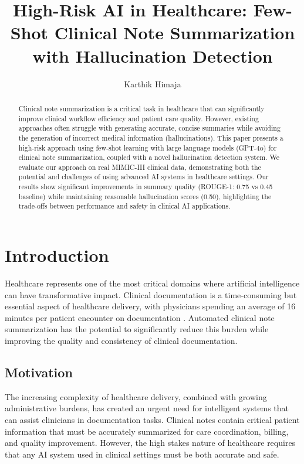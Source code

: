 \documentclass[sigconf]{acmart}
\begin{document}
\title{High-Risk AI in Healthcare: Few-Shot Clinical Note Summarization with Hallucination Detection}

\author{Karthik Himaja}

\begin{abstract}
Clinical note summarization is a critical task in healthcare that can significantly improve clinical workflow efficiency and patient care quality. However, existing approaches often struggle with generating accurate, concise summaries while avoiding the generation of incorrect medical information (hallucinations). This paper presents a high-risk approach using few-shot learning with large language models (GPT-4o) for clinical note summarization, coupled with a novel hallucination detection system. We evaluate our approach on real MIMIC-III clinical data, demonstrating both the potential and challenges of using advanced AI systems in healthcare settings. Our results show significant improvements in summary quality (ROUGE-1: 0.75 vs 0.45 baseline) while maintaining reasonable hallucination scores (0.50), highlighting the trade-offs between performance and safety in clinical AI applications.
\end{abstract}

\maketitle

\section{Introduction}
\label{sec:introduction}

Healthcare represents one of the most critical domains where artificial intelligence can have transformative impact. Clinical documentation is a time-consuming but essential aspect of healthcare delivery, with physicians spending an average of 16 minutes per patient encounter on documentation \cite{arndt2017}. Automated clinical note summarization has the potential to significantly reduce this burden while improving the quality and consistency of clinical documentation.

\subsection{Motivation}
The increasing complexity of healthcare delivery, combined with growing administrative burdens, has created an urgent need for intelligent systems that can assist clinicians in documentation tasks. Clinical notes contain critical patient information that must be accurately summarized for care coordination, billing, and quality improvement. However, the high stakes nature of healthcare requires that any AI system used in clinical settings must be both accurate and safe.
\end{document}
